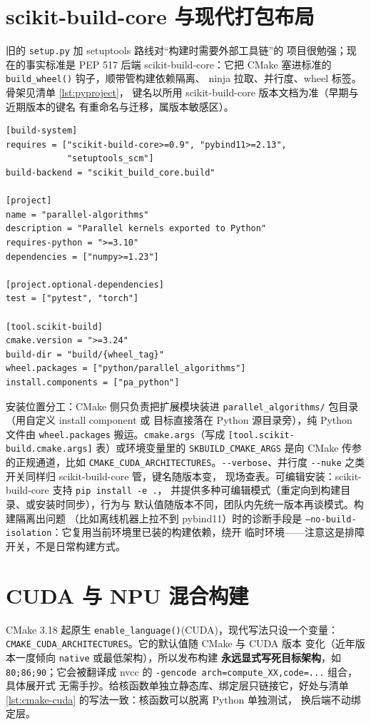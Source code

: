 \documentclass[12pt,a4paper,fontset=fandol]{ctexbook}
\newcommand{\Fn}[1]{\texttt{#1()}}
\newcommand{\Tp}[1]{\texttt{#1}}
\newcommand{\Opt}[1]{\texttt{-\/-#1}}
\newcommand{\Bk}{\allowbreak}
\begin{document}
\section{scikit-build-core 与现代打包布局}

旧的 \Tp{setup.py} 加 setuptools 路线对``构建时需要外部工具链''的
项目很勉强；现在的事实标准是 PEP 517 后端 scikit-build-core：它把
CMake 塞进标准的 \Fn{build\_wheel} 钩子，顺带管构建依赖隔离、
ninja 拉取、并行度、wheel 标签。骨架见清单 \ref{lst:pyproject}，
键名以所用 scikit-build-core 版本文档为准（早期与近期版本的键名
有重命名与迁移，属版本敏感区）。

\begin{lstlisting}[style=tomlstyle,caption={pyproject.toml 关键段},label={lst:pyproject}]
[build-system]
requires = ["scikit-build-core>=0.9", "pybind11>=2.13",
            "setuptools_scm"]
build-backend = "scikit_build_core.build"

[project]
name = "parallel-algorithms"
description = "Parallel kernels exported to Python"
requires-python = ">=3.10"
dependencies = ["numpy>=1.23"]

[project.optional-dependencies]
test = ["pytest", "torch"]

[tool.scikit-build]
cmake.version = ">=3.24"
build-dir = "build/{wheel_tag}"
wheel.packages = ["python/parallel_algorithms"]
install.components = ["pa_python"]
\end{lstlisting}

安装位置分工：CMake 侧只负责把扩展模块装进
\Tp{parallel\_algorithms/} 包目录（用自定义 install component 或
目标直接落在 Python 源目录旁），纯 Python 文件由
\Tp{wheel.packages} 搬运。\Tp{cmake.args}（写成
\Tp{[tool.scikit-build.cmake.args]} 表）或环境变量里的
\Tp{SKBUILD\_CMAKE\_ARGS} 是向 CMake 传参的正规通道，比如
\Tp{CMAKE\_CUDA\_ARCHITECTURES}。\Opt{verbose}、并行度
\Opt{nuke} 之类开关同样归 scikit-build-core 管，键名随版本变，
现场查表。可编辑安装：scikit-build-core 支持 \Tp{pip install -e .}，
并提供多种可编辑模式（重定向到构建目录、或安装时同步），行为与
默认值随版本不同，团队内先统一版本再谈模式。构建隔离出问题
（比如离线机器上拉不到 pybind11）时的诊断手段是
\Tp{--no-build-isolation}：它复用当前环境里已装的构建依赖，绕开
临时环境——注意这是排障开关，不是日常构建方式。

\section{CUDA 与 NPU 混合构建}

CMake 3.18 起原生 \Fn{enable\_{\Bk}language}(CUDA)，现代写法只设一个变量：
\Tp{CMAKE\_{\Bk}CUDA\_{\Bk}ARCHITECTURES}。它的默认值随 CMake 与 CUDA 版本
变化（近年版本一度倾向 \Tp{native} 或最低架构），所以发布构建
\textbf{永远显式写死目标架构}，如 \Tp{80;86;90}；它会被翻译成
nvcc 的 \Tp{-gencode arch=compute\_{\Bk}XX,code=...} 组合，具体展开式
无需手抄。给核函数单独立静态库、绑定层只链接它，好处与清单
\ref{lst:cmake-cuda} 的写法一致：核函数可以脱离 Python 单独测试，
换后端不动绑定层。
\end{document}
